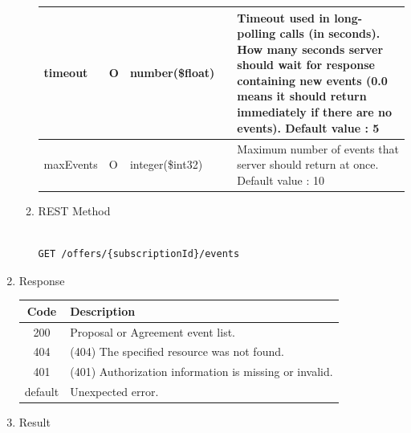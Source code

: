 \begin{enumerate}
\begin{enumerate}
\begin{table}[H]
\begin{center}
\begin{tabular}{|p{3cm}|l|p{3cm}|p{3cm}|p{4cm}|}
timeout			& O	& 	number(\$float)	&		&	Timeout used in long-polling calls (in seconds). 
													How many seconds server should wait for response containing new events 
													(0.0 means it should return immediately if there are no events).	Default value : 5 \\ 

\hline

maxEvents		& O & integer(\$int32)	&		&	Maximum number of events that server should return at once.		Default value : 10 \\

\hline	

\end{tabular}
\end{center}

\end{table}

\item REST Method

\begin{tcolorbox}[boxrule=0pt, frame empty]
\begin{verbatim} 

GET /offers/{subscriptionId}/events

\end{verbatim}
\end{tcolorbox}

\end{enumerate}

\item Response

\begin{table}[H]
\footnotesize

\begin{center}
\begin{tabular}{|c|l|} 
\hline
\rowcolor{lightgray}	Code 		& 	Description \\
\hline
200	 		&	Proposal or Agreement event list. \\
\hline
404			&	(404) The specified resource was not found. \\
\hline
401			&	(401) Authorization information is missing or invalid. \\
\hline
default		&	Unexpected error. \\
\hline
\end{tabular}
\end{center}

\end{table}

\item Result


\end{enumerate}
